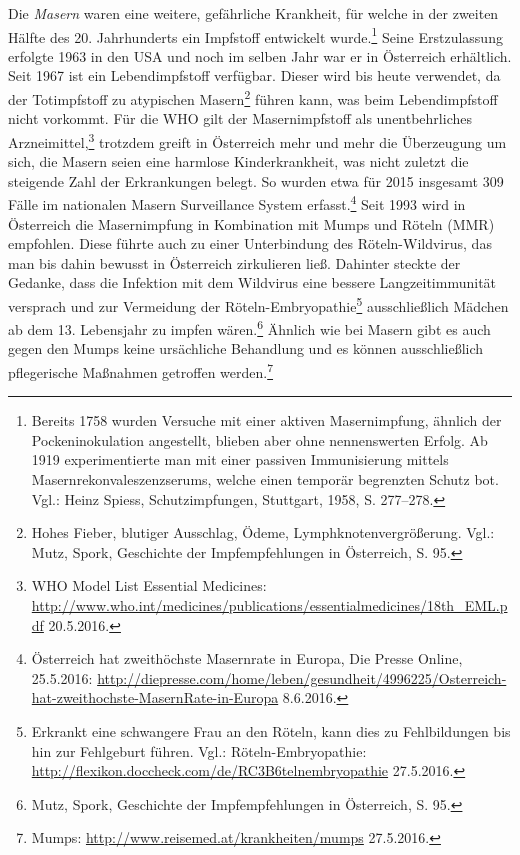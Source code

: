 \documentclass[
    a4paper,
    12pt,
    hyphens,
    chapterprefix=true,
    headheight=33pt,
    footheight=29pt,
    headings=optiontohead,
]{scrartcl}
\begin{document}
Die \textit{Masern} waren eine weitere, gefährliche Krankheit, für welche in der zweiten Hälfte des 20. Jahrhunderts ein Impfstoff entwickelt
wurde.\footnote{Bereits 1758 wurden Versuche mit einer aktiven Masernimpfung, ähnlich der Pockeninokulation angestellt, blieben aber ohne nennenswerten Erfolg. Ab 1919 experimentierte man mit einer passiven Immunisierung mittels Masernrekonvaleszenzserums, welche einen temporär begrenzten Schutz bot. Vgl.: Heinz Spiess, Schutzimpfungen, Stuttgart, 1958, S. 277--278.} Seine Erstzulassung erfolgte 1963 in den USA und noch im selben Jahr war er in Österreich erhältlich. Seit 1967 ist ein
Lebendimpfstoff verfügbar. Dieser wird bis heute verwendet, da der Totimpfstoff
zu atypischen Masern\footnote{Hohes Fieber, blutiger Ausschlag, Ödeme, Lymphknotenvergrößerung. Vgl.: Mutz, Spork, Geschichte
der Impfempfehlungen in Österreich, S. 95.} führen kann, was beim Lebendimpfstoff nicht vorkommt. Für die WHO gilt der Masernimpfstoff als unentbehrliches Arzneimittel,\footnote{WHO Model List Essential Medicines: \url{http://www.who.int/medicines/publications/essentialmedicines/18th_EML.pdf} 20.5.2016.}
trotzdem greift in Österreich mehr und mehr die Überzeugung um sich, die Masern seien eine harmlose Kinderkrankheit, was nicht
zuletzt die steigende Zahl der Erkrankungen belegt. So wurden etwa für 2015 insgesamt 309 Fälle im nationalen Masern Surveillance
System erfasst.\footnote{Österreich hat zweithöchste Masernrate in Europa, Die Presse Online, 25.5.2016:
\url{http://diepresse.com/home/leben/gesundheit/4996225/Osterreich-hat-zweithochste-MasernRate-in-Europa} 8.6.2016.}
Seit 1993 wird in Österreich die Masernimpfung in Kombination mit Mumps und Röteln (MMR) empfohlen. Diese
führte auch zu einer Unterbindung des Röteln-Wildvirus, das man bis dahin bewusst in Österreich zirkulieren ließ.
Dahinter steckte der Gedanke, dass die Infektion mit dem Wildvirus eine bessere Langzeitimmunität versprach und zur Vermeidung der
Röteln-Embryopathie\footnote{Erkrankt eine schwangere Frau an den Röteln, kann dies zu Fehlbildungen bis hin zur Fehlgeburt führen.
Vgl.: Röteln-Embryopathie: \url{http://flexikon.doccheck.com/de/RC3B6telnembryopathie} 27.5.2016.} ausschließlich Mädchen
ab dem 13. Lebensjahr zu impfen wären.\footnote{Mutz, Spork, Geschichte der Impfempfehlungen in Österreich, S. 95.}
Ähnlich wie bei Masern gibt es auch gegen den Mumps keine ursächliche Behandlung und es können ausschließlich
pflegerische Maßnahmen getroffen werden.\footnote{Mumps: \url{http://www.reisemed.at/krankheiten/mumps} 27.5.2016.}\\
\end{document}

